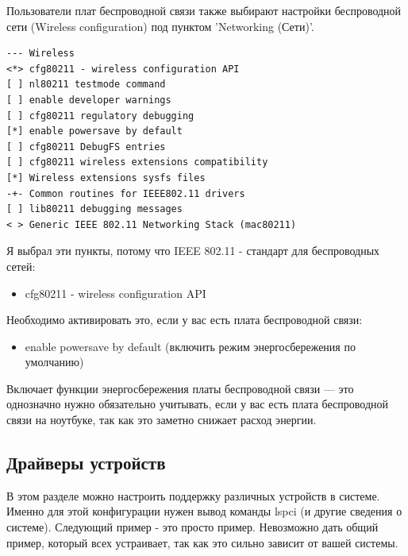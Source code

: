 \documentclass[10pt]{book}
\begin{document}
Пользователи плат беспроводной связи также выбирают настройки беспроводной сети (Wireless configuration) под пунктом 'Networking (Сети)'.

\vspace{3mm}
\begin{tcolorbox}[colback=gray!14!white, colframe=blue!75!blue]
\begin{lstlisting}
--- Wireless
<*> cfg80211 - wireless configuration API
[ ] nl80211 testmode command
[ ] enable developer warnings
[ ] cfg80211 regulatory debugging
[*] enable powersave by default
[ ] cfg80211 DebugFS entries
[ ] cfg80211 wireless extensions compatibility
[*] Wireless extensions sysfs files
-+- Common routines for IEEE802.11 drivers
[ ] lib80211 debugging messages
< > Generic IEEE 802.11 Networking Stack (mac80211)
\end{lstlisting}
\end{tcolorbox}

Я выбрал эти пункты, потому что IEEE 802.11 - стандарт для беспроводных сетей:

\begin{itemize}
\item cfg80211 - wireless configuration API
\end{itemize}

Необходимо активировать это, если у вас есть  плата беспроводной связи:

\begin{itemize}
\item  enable powersave by default (включить режим энергосбережения по умолчанию)                                                                            
\end{itemize}

Включает функции энергосбережения платы беспроводной связи — это однозначно нужно обязательно учитывать, если у вас есть плата беспроводной связи на ноутбуке, так как это заметно снижает расход энергии.

\subsection{Драйверы устройств}

В этом разделе можно настроить поддержку различных устройств в системе. Именно для этой конфигурации нужен вывод команды lspci (и другие сведения о системе). Следующий пример - это просто пример. Невозможно дать общий пример, который всех устраивает, так как это сильно зависит от вашей системы. 
\end{document}
